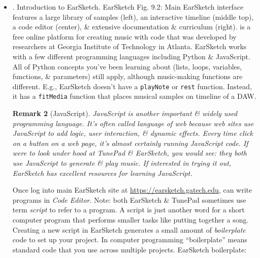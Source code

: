 \documentclass{article}
\newtheorem{remark}{Remark}
\begin{document}
\begin{itemize}
\begin{itemize}
		When combining samples in your composition, be mindful of how different musical elements work with 1 another. If your song is in E major \& add a sample that's in D minor, it might clash harmonically. If sample is in a different tempo, it might not line up rhythmically with rest of your song. Samples get manipulated in pitch or tempo or a variety of other ways to make them work stylistically with rest of a song.
		\begin{remark}[Copyright law]
			Be aware of copyright issues around music that you sample, especially if you're thinking about sharing it online or licensing it to make money. Most of music on TunePad \& EarSketch websites is licensed so that you can use them however you want, but important to get permission or a license when sampling other artists' music.
		\end{remark}
		\item {. Introduction to EarSketch.} EarSketch {\sf Fig. 9.2: Main EarSketch interface features a large library of samples (left), an interactive timeline (middle top), a code editor (center), \& extensive documentation \& curriculum (right).} is a free online platform for creating music with code that was developed by researchers at Georgia Institute of Technology in Atlanta. EarSketch works with a few different programming languages including Python \& JavaScript. All of Python concepts you've been learning about (lists, loops, variables, functions, \& parameters) still apply, although music-making functions are different. E.g., EarSketch doesn't have a {\tt playNote} or {\tt rest} function. Instead, it has a {\tt fitMedia} function that places musical samples on timeline of a DAW.
		\begin{remark}[JavaScript]
			JavaScript is another important \& widely used programming language. It's often called {\rm language of web} because web sites use JavaScript to add logic, user interaction, \& dynamic effects. Every time click on a button on a web page, it's almost certainly running JavaScript code. If were to look under hood at TunePad \& EarSketch, you would see: they both use JavaScript to generate \& play music. If interested in trying it out, EarSketch has excellent resources for learning JavaScript.			
		\end{remark}
		Once log into main EarSketch site at \url{https://earsketch.gatech.edu}, can write programs in {\it Code Editor}. Note: both EarSketch \& TunePad sometimes use term {\it script} to refer to a program. A script is just another word for a short computer program that performs smaller tasks like putting together a song. Creating a new script in EarSketch generates a small amount of {\it boilerplate} code to set up your project. In computer programming ``boilerplate'' means standard code that you use across multiple projects. EarSketch boilerplate:

\end{itemize}
\end{itemize}
\end{document}
